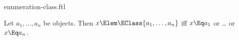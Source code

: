 \documentclass{stex}
\begin{document}
\begin{smodule}{enumeration-class.ftl}


\begin{fakeforthel}
  \begin{axiom}
    Let $a_1,\dots,a_n$ be objects.
    Then $x \Elem \EClass{a_1,\dots,a_n}$ iff $x \Eq a_1$ or \dots{} or $x \Eq a_n$.
  \end{axiom}
\end{fakeforthel}

\end{smodule}
\end{document}
